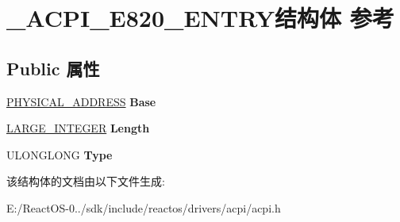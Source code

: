 \hypertarget{struct___a_c_p_i___e820___e_n_t_r_y}{}\section{\+\_\+\+A\+C\+P\+I\+\_\+\+E820\+\_\+\+E\+N\+T\+R\+Y结构体 参考}
\label{struct___a_c_p_i___e820___e_n_t_r_y}
\subsection*{Public 属性}
\begin{DoxyCompactItemize}
\item 
\mbox{\label{struct___a_c_p_i___e820___e_n_t_r_y_ac83a8f029beaf5f2cc99210e5b9f7dd7}} 
\hyperlink{union___l_a_r_g_e___i_n_t_e_g_e_r}{P\+H\+Y\+S\+I\+C\+A\+L\+\_\+\+A\+D\+D\+R\+E\+SS} {\bfseries Base}
\item 
\mbox{\label{struct___a_c_p_i___e820___e_n_t_r_y_a2ff7bbbc48a4dc599b6f5febf0467590}} 
\hyperlink{union___l_a_r_g_e___i_n_t_e_g_e_r}{L\+A\+R\+G\+E\+\_\+\+I\+N\+T\+E\+G\+ER} {\bfseries Length}
\item 
\mbox{\label{struct___a_c_p_i___e820___e_n_t_r_y_a90d56ebfbb8f57fbad0095ebe2cac24a}} 
U\+L\+O\+N\+G\+L\+O\+NG {\bfseries Type}
\end{DoxyCompactItemize}


该结构体的文档由以下文件生成\+:\begin{DoxyCompactItemize}
\item 
E\+:/\+React\+O\+S-\/0../sdk/include/reactos/drivers/acpi/acpi.\+h\end{DoxyCompactItemize}
